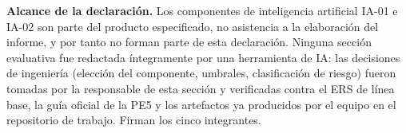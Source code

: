 \noindent\textbf{Alcance de la declaración.} Los componentes de inteligencia artificial IA-01 e IA-02 son parte del producto especificado, no asistencia a la elaboración del informe, y por tanto no forman parte de esta declaración. Ninguna sección evaluativa fue redactada íntegramente por una herramienta de IA: las decisiones de ingeniería (elección del componente, umbrales, clasificación de riesgo) fueron tomadas por la responsable de esta sección y verificadas contra el ERS de línea base, la guía oficial de la PE5 y los artefactos ya producidos por el equipo en el repositorio de trabajo. Firman los cinco integrantes.
